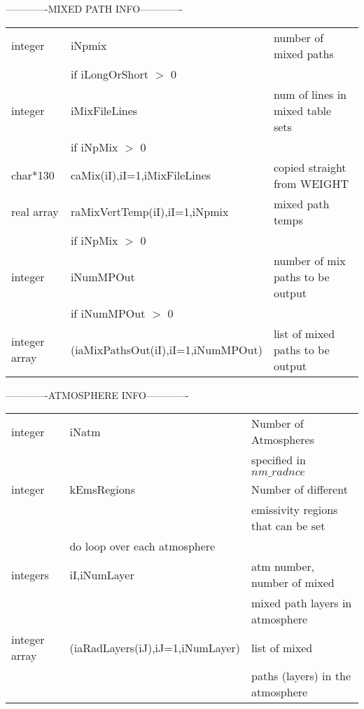 \documentclass[12pt]{article}
\newlength{\colwidth}
\begin{document}
{{{{-------------MIXED PATH INFO-------------\\
\begin{small}
\begin{longtable}{llp{\colwidth}}
{\sf integer}  & iNpmix                  & number of mixed paths\\
               & if iLongOrShort $>$ 0   & \\
{\sf integer}  &\indent iMixFileLines    & num of lines in mixed table sets \\
               &\indent if iNpMix $>$ 0   & \\
{\sf char*130} &\indent \indent caMix(iI),iI=1,iMixFileLines & copied 
                                       straight from WEIGHT\\
{\sf real array}&\indent \indent raMixVertTemp(iI),iI=1,iNpmix 
                                         & mixed path temps\\
               & if iNpMix $>$ 0   & \\
{\sf integer}  &\indent iNumMPOut        & number of mix paths to be output\\
               & \indent if iNumMPOut $>$ 0 & \\
{\sf integer array} &\indent \indent (iaMixPathsOut(iI),iI=1,iNumMPOut) & 
list of mixed paths to be output\\
\end{longtable}
\end{small}
-------------ATMOSPHERE INFO-------------\\
\begin{small}
\begin{longtable}{llp{\colwidth}}
{\sf integer} &iNatm & Number of Atmospheres \\
              &      & specified in $nm\_radnce$\\
{\sf integer} &kEmsRegions & Number of different \\
              &            & emissivity regions that can be set\\
              &do loop over each atmosphere & \\
{\sf integers}&\indent iI,iNumLayer         & atm number, number of mixed\\
              &                             & mixed path layers in atmosphere\\
{\sf integer array} &\indent(iaRadLayers(iJ),iJ=1,iNumLayer) & list of mixed \\
                    &                 & paths (layers) in the atmosphere\\

\end{longtable}
\end{small}}}}}
\end{document}
